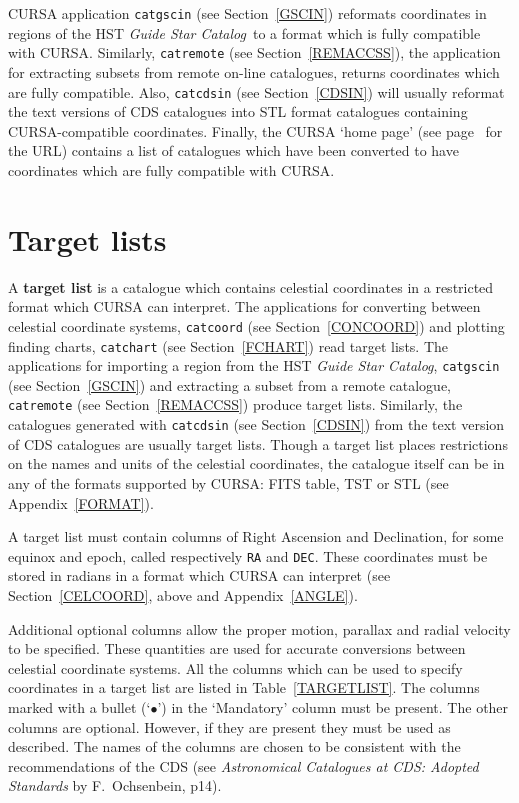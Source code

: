 \documentclass[twoside,11pt]{article}
\newcommand{\htmladdnormallink}[2]{#1}
\newcommand{\xlabel}[1]{}
\renewcommand{\_}{\texttt{\symbol{95}}}
\begin{document}
CURSA application {\tt catgscin} (see Section~\ref{GSCIN}) reformats
coordinates in regions of the HST {\it Guide Star Catalog}\, to a
format which is fully compatible with CURSA.  Similarly, {\tt catremote}
(see Section~\ref{REMACCSS}), the application for extracting subsets
from remote on-line catalogues, returns coordinates which are fully
compatible.  Also, {\tt catcdsin} (see Section~\ref{CDSIN}) will
usually reformat the text versions of CDS catalogues into STL format
catalogues containing CURSA-compatible coordinates.  Finally, the CURSA 
`\htmladdnormallink{home page}{http://www.starlink.ac.uk/cursa/}'
(see page~\pageref{HOMEPAGE} for the URL) contains a list of catalogues
which have been converted to have coordinates which are fully compatible
with CURSA.


\section{\xlabel{TARGLIST}\label{TARGLIST}Target lists}

A {\bf target list} is a catalogue which contains celestial coordinates
in a restricted format which CURSA can interpret.  The applications for
converting between celestial coordinate systems, {\tt catcoord} (see
Section~\ref{CONCOORD}) and plotting finding charts, {\tt catchart} (see
Section~\ref{FCHART}) read target lists.  The applications for
importing a region from the HST {\it Guide Star Catalog}, {\tt catgscin}
(see Section~\ref{GSCIN})
and extracting a subset from a remote catalogue, {\tt catremote} (see
Section~\ref{REMACCSS}) produce target lists.  Similarly, the catalogues
generated with {\tt catcdsin} (see Section~\ref{CDSIN}) from the text
version of CDS catalogues are usually target lists.  Though a target
list places restrictions on the names and units of the celestial
coordinates, the catalogue itself can be in any of the formats supported
by CURSA: FITS table, TST or STL (see Appendix~\ref{FORMAT}).

A target list must contain columns of Right Ascension and Declination,
for some equinox and epoch, called respectively {\tt RA} and {\tt DEC}.
These coordinates must be stored in radians in a format which CURSA can
interpret (see Section~\ref{CELCOORD}, above and Appendix~\ref{ANGLE}).

Additional optional columns allow the proper motion, parallax and radial
velocity to be specified.  These quantities are used for accurate
conversions between celestial coordinate systems.  All the columns which
can be used to specify coordinates in a target list are listed in
Table~\ref{TARGETLIST}.  The columns marked with a bullet (`$\bullet$')
in the `Mandatory' column must be present.  The other columns are
optional. However, if they are present they must be used as described.
The names of the columns are chosen to be consistent with the
recommendations of the CDS (see {\it Astronomical Catalogues at CDS:
Adopted Standards} by F.~Ochsenbein\cite{CDSTAND}, p14).
\end{document}
